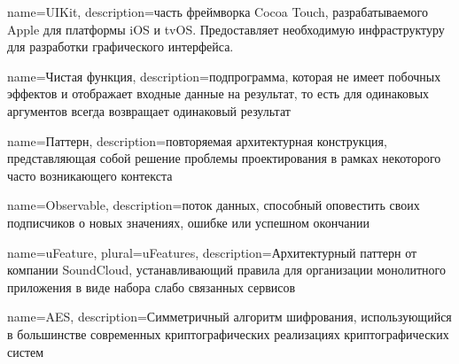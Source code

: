 

{
  name={UIKit},
  description={часть фреймворка Cocoa Touch, разрабатываемого Apple для платформы iOS и tvOS. Предоставляет необходимую инфраструктуру для разработки графического интерфейса.}
}

{
  name={Чистая функция},
  description={подпрограмма, которая не имеет побочных эффектов и отображает входные данные на результат, то есть для одинаковых аргументов всегда возвращает одинаковый результат}
}

{
  name={Паттерн},
  description={повторяемая архитектурная конструкция, представляющая собой решение проблемы проектирования в рамках некоторого часто возникающего контекста}
}

{
  name=Observable,
  description={поток данных, способный оповестить своих подписчиков о новых значениях, ошибке или успешном окончании}
}

{
  name=uFeature,
  plural={uFeatures},
  description={Архитектурный паттерн от компании SoundCloud, устанавливающий правила для организации монолитного приложения в виде набора слабо связанных сервисов}
}

{
  name=AES,
  description={Симметричный алгоритм шифрования, использующийся в большинстве современных криптографических реализациях криптографических систем}
}


\glsaddall
